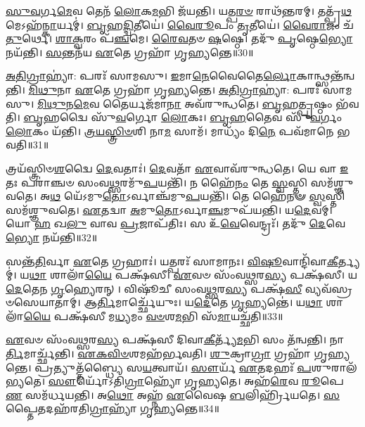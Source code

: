 \-\ul{𑌸𑍁}\-\-\ul{𑌵}\-𑌰𑍍𑌗\-\ul{𑌮𑍇}\-𑌵 𑌤𑍇𑌨᳴ \ul{𑌲𑍋}\-𑌕\-\ul{𑌮}\-𑌭𑌿 𑌜᳴𑌯𑌨𑍍𑌤𑌿।
𑌯𑌤𑍍𑌪\-\ul{𑌰}\-\-\ul{𑍞} 𑌰𑌾𑌥᳴𑌨𑍍𑌤𑌰𑌮𑍍।
𑌤𑌤𑍍𑌪𑍍𑌰᳴\-\ul{𑌥}\-𑌮𑍇\-𑌽𑌹᳴\-\ul{𑌨𑍍𑌕𑌾}\-𑌰𑍍𑌯𑌮𑍍॑।
\-\ul{𑌬𑍃}\-𑌹\-\ul{𑌦𑍍𑌦𑍍𑌵𑌿}\-𑌤𑍀𑌯𑍇॑।
\-\ul{𑌵𑍈}\-\-\ul{𑌰𑍂}\-𑌪𑌂 \ul{𑌤𑍃}\-𑌤𑍀𑌯𑍇॑।
\-\ul{𑌵𑍈}\-\-\ul{𑌰𑌾}\-𑌜𑌂 𑌚᳴\-\ul{𑌤𑍁}\-𑌰𑍍𑌥𑍇।
\-\ul{𑌶𑌾}\-\-\ul{𑌕𑍍𑌵}\-𑌰𑌂 𑌪᳴\-\ul{𑌞𑍍𑌚}\-𑌮𑍇।
\-\ul{𑌰𑍈}\-\-\ul{𑌵}\-𑌤𑍞 \ul{𑌷}\-𑌷𑍍𑌠𑍇।
𑌤𑌦𑍁᳴ \ul{𑌪𑍃}\-𑌷𑍍𑌠𑍇\-\ul{𑌭𑍍𑌯𑍋} 𑌨𑌯᳴𑌨𑍍𑌤𑌿।
\-\ul{𑌸}\-𑌨𑍍𑌤𑌨᳴𑌯 \ul{𑌏}\-𑌤𑍇 𑌗𑍍𑌰𑌹𑌾᳴ 𑌗𑍃𑌹𑍍𑌯𑌨𑍍𑌤𑍇॥30॥

\-\ul{𑌅}\-\-\ul{𑌤𑌿}\-\-\ul{𑌗𑍍𑌰𑌾}\-𑌹𑍍𑌯𑌾॑: 𑌪𑌰𑌃᳴ 𑌸𑌾𑌮𑌸𑍁।
\-\ul{𑌇}\-𑌮𑌾\-\ul{𑌨𑍇}\-𑌵𑍈𑌤𑍈\-\ul{𑌰𑍍𑌲𑍋}\-𑌕𑌾𑌨𑍍𑌥𑍍𑌸𑌨𑍍𑌤᳴𑌨𑍍𑌵𑌨𑍍𑌤𑌿।
\-\ul{𑌮𑌿}\-\-\ul{𑌥𑍁}\-𑌨𑌾 \ul{𑌏}\-𑌤𑍇 𑌗𑍍𑌰𑌹𑌾᳴ 𑌗𑍃𑌹𑍍𑌯𑌨𑍍𑌤𑍇।
\-\ul{𑌅}\-\-\ul{𑌤𑌿}\-\-\ul{𑌗𑍍𑌰𑌾}\-𑌹𑍍𑌯𑌾॑: 𑌪𑌰𑌃᳴ 𑌸𑌾𑌮𑌸𑍁।
\-\ul{𑌮𑌿}\-\-\ul{𑌥𑍁}\-𑌨\-\ul{𑌮𑍇}\-𑌵 𑌤𑍈𑌰𑍍𑌯𑌜᳴𑌮𑌾\-\ul{𑌨𑌾} 𑌅𑌵᳴𑌰𑍁𑌨𑍍𑌧𑌤𑍇।
\-\ul{𑌬𑍃}\-𑌹\-\ul{𑌤𑍍𑌪𑍃}\-𑌷𑍍𑌠𑌂 𑌭᳴𑌵𑌤𑌿।
\-\ul{𑌬𑍃}\-𑌹𑌦𑍍𑌵𑍈 𑌸𑍁᳴\-\ul{𑌵}\-𑌰𑍍𑌗𑍋 \ul{𑌲𑍋}\-𑌕𑌃।
\-\ul{𑌬𑍃}\-\-\ul{𑌹}\-𑌤𑍈𑌵 𑌸𑍁᳴\-\ul{𑌵}\-𑌰𑍍𑌗𑌂 \ul{𑌲𑍋}\-𑌕𑌂 𑌯᳴𑌨𑍍𑌤𑌿।
\-\ul{𑌤𑍍𑌰}\-\-\ul{𑌯}\-\-\ul{𑌸𑍍𑌤𑍍𑌰𑌿}\-\-\ul{𑍞}\-𑌶𑌿  𑌨𑌾\-\ul{𑌮} 𑌸𑌾𑌮᳴।
𑌮𑌾𑌧𑍍𑌯𑌂᳴ 𑌦𑌿\-\ul{𑌨𑍇} 𑌪𑌵᳴𑌮𑌾𑌨𑍇 𑌭𑌵𑌤𑌿॥31॥

𑌤𑍍𑌰𑌯᳴𑌸𑍍𑌤𑍍𑌰𑌿𑍞\-\ul{𑌶}\-𑌦𑍍𑌵𑍈 \ul{𑌦𑍇}\-𑌵𑌤𑌾𑌃॑।
\-\ul{𑌦𑍇}\-𑌵𑌤𑌾᳴ \ul{𑌏}\-𑌵𑌾𑌵᳴𑌰𑍁𑌨𑍍𑌧𑌤𑍇।
𑌯𑍇 𑌵𑌾 \ul{𑌇}\-𑌤𑌃 𑌪𑌰𑌾॑𑌞𑍍𑌚𑍞 𑌸𑌂𑌵\-\ul{𑌥𑍍𑌸}\-𑌰𑌮𑍁᳴\-\ul{𑌪}\-𑌯𑌨𑍍𑌤𑌿᳴।
𑌨 𑌹𑍈᳴\-\ul{𑌨𑌂} 𑌤𑍇 \ul{𑌸𑍍𑌵}\-𑌸𑍍𑌤𑌿 𑌸𑌮᳴𑌶𑍍𑌞𑍁𑌵𑌤𑍇।
𑌅\-\ul{𑌥} 𑌯𑍇᳴\-𑌽𑌮𑍁\-\ul{𑌤𑍋}\-\-𑌽𑌰𑍍𑌵𑌾𑌞𑍍𑌚᳴𑌮𑍁\-\ul{𑌪}\-𑌯𑌨𑍍𑌤𑌿᳴।
𑌤𑍇 𑌹𑍈᳴𑌨𑍟 \ul{𑌸𑍍𑌵}\-𑌸𑍍𑌤𑌿 𑌸𑌮᳴𑌶𑍍𑌞𑍁𑌵𑌤𑍇।
\-\ul{𑌏}\-𑌤𑌦𑍍𑌵𑌾 \ul{𑌅}\-𑌮𑍁\-\ul{𑌤𑍋}\-\-𑌽𑌰𑍍𑌵𑌾\-\ul{𑌞𑍍𑌚}\-𑌮𑍁𑌪᳴𑌯𑌨𑍍𑌤𑌿।
𑌯\-\ul{𑌦𑍇}\-𑌵𑌮𑍍।
𑌯𑍋 \ul{𑌹} 𑌖\-\ul{𑌲𑍁} 𑌵𑌾𑌵 \ul{𑌪𑍍𑌰}\-𑌜𑌾\-𑌪᳴𑌤𑌿𑌃।
𑌸 𑌉᳴\-\ul{𑌵𑍇}\-𑌵𑍇𑌨𑍍𑌦𑍍𑌰𑌃᳴।
𑌤𑌦𑍁᳴ \ul{𑌦𑍇}\-𑌵𑍇\-\ul{𑌭𑍍𑌯𑍋} 𑌨𑌯᳴𑌨𑍍𑌤𑌿॥32॥\anuvakamend[\-\ul{𑌕𑌾}\-𑌰𑍍𑌯𑌾᳴ \ul{𑌵𑌿}\-𑌰𑌾𑌡𑍍𑌗𑍃᳴𑌹𑍍𑌯\-\ul{𑌨𑍍𑌤𑍇} 𑌪𑌵᳴𑌮𑌾𑌨𑍇 𑌭\-\ul{𑌵}\-𑌤𑍀\-\ul{𑌨𑍍𑌦𑍍𑌰} 𑌏𑌕𑌂᳴ 𑌚]

𑌸𑌨𑍍𑌤᳴\-\ul{𑌤𑌿}\-𑌰𑍍𑌵𑌾 \ul{𑌏}\-𑌤𑍇 𑌗𑍍𑌰𑌹𑌾𑌃॑।
𑌯𑌤𑍍𑌪𑌰𑌃᳴ 𑌸𑌾𑌮𑌾𑌨𑌃।
\-\ul{𑌵𑌿}\-\-\ul{𑌷𑍂}\-𑌵𑌾𑌨𑍍𑌦𑌿᳴𑌵𑌾\-\-\ul{𑌕𑍀}\-𑌰𑍍𑌤𑍍𑌯𑌮𑍍॑।
𑌯\-\ul{𑌥𑌾} 𑌶𑌾𑌲𑌾᳴\-\ul{𑌯𑍈} 𑌪𑌕𑍍𑌷᳴𑌸𑍀।
\-\ul{𑌏}\-𑌵𑍞 𑌸𑌂᳴𑌵\-\ul{𑌥𑍍𑌸}\-𑌰\-\ul{𑌸𑍍𑌯} 𑌪𑌕𑍍𑌷᳴𑌸𑍀।
𑌯\-\ul{𑌦𑍇}\-𑌤𑍇𑌨 \ul{𑌗𑍃}\-𑌹𑍍𑌯𑍇𑌰𑌨𑍍।
𑌵𑌿𑌷𑍂᳴𑌚𑍀 𑌸𑌂𑌵\-\ul{𑌥𑍍𑌸}\-𑌰\-\ul{𑌸𑍍𑌯} 𑌪𑌕𑍍𑌷᳴\-\ul{𑌸𑍀} 𑌵𑍍𑌯𑌵᳴𑌸𑍍𑌰𑍞𑌸𑍇𑌯𑌾𑌤𑌾𑌮𑍍।
𑌆\-\ul{𑌰𑍍𑌤𑌿}\-𑌮𑌾𑌰𑍍𑌚𑍍𑌛𑍇᳴𑌯𑍁𑌃।
𑌯\-\ul{𑌦𑍇}\-𑌤𑍇 \ul{𑌗𑍃}\-𑌹𑍍𑌯𑌨𑍍𑌤𑍇॑।
𑌯\-\ul{𑌥𑌾} 𑌶𑌾𑌲𑌾᳴\-\ul{𑌯𑍈} 𑌪𑌕𑍍𑌷᳴𑌸𑍀 𑌮\-\ul{𑌧𑍍𑌯}\-𑌮𑌂 \ul{𑌵}\-\-\ul{𑍞}\-𑌶\-\ul{𑌮}\-𑌭𑌿 𑌸᳴\-\ul{𑌮𑌾}\-𑌯𑌚𑍍𑌛᳴𑌤𑌿॥33॥

\-\ul{𑌏}\-𑌵𑍞 𑌸𑌂᳴𑌵\-\ul{𑌥𑍍𑌸}\-𑌰\-\ul{𑌸𑍍𑌯} 𑌪𑌕𑍍𑌷᳴𑌸𑍀 𑌦𑌿𑌵𑌾\-\ul{𑌕𑍀}\-𑌰𑍍𑌤𑍍𑌯᳴\-\ul{𑌮}\-𑌭𑌿 𑌸𑌂 𑌤᳴𑌨𑍍𑌵𑌨𑍍𑌤𑌿।
𑌨𑌾\-\ul{𑌰𑍍𑌤𑌿}\-𑌮𑌾𑌰𑍍𑌚𑍍𑌛᳴𑌨𑍍𑌤𑌿।
\-\ul{𑌏}\-\-\ul{𑌕}\-\-\ul{𑌵𑌿}\-\-\ul{𑍞}\-𑌶𑌮𑌹᳴𑌰𑍍𑌭𑌵𑌤𑌿।
\-\ul{𑌶𑍁}\-𑌕𑍍𑌰𑌾\-\ul{𑌗𑍍𑌰𑌾} 𑌗𑍍𑌰𑌹𑌾᳴ 𑌗𑍃𑌹𑍍𑌯𑌨𑍍𑌤𑍇।
𑌪𑍍𑌰𑌤𑍍𑌯𑍁𑌤𑍍𑌤᳴𑌬𑍍𑌧𑍍𑌯𑍈 𑌸\-\ul{𑌯}\-𑌤𑍍𑌵𑌾𑌯᳴।
\-\ul{𑌸𑍗}\-𑌰𑍍𑌯᳴ \ul{𑌏}\-𑌤𑌦𑌹𑌃᳴ \ul{𑌪}\-𑌶𑍁𑌰𑌾𑌲᳴𑌭𑍍𑌯𑌤𑍇।
\-\ul{𑌸𑍗}\-𑌰𑍍𑌯𑍋᳴\-𑌽𑌤𑌿\-\ul{𑌗𑍍𑌰𑌾}\-𑌹𑍍𑌯𑍋᳴ 𑌗𑍃𑌹𑍍𑌯𑌤𑍇।
𑌅𑌹᳴\-\ul{𑌰𑍇}\-𑌵 \ul{𑌰𑍂}\-𑌪𑍇\-\ul{𑌣} 𑌸𑌮᳴𑌰𑍍𑌧𑌯𑌨𑍍𑌤𑌿।
𑌅\-\ul{𑌥𑍋} 𑌅𑌹𑍍𑌨᳴ \ul{𑌏}\-𑌵𑍈𑌷 \ul{𑌬}\-𑌲𑌿𑌰𑍍\mbox{}𑌹𑍍𑌰𑌿᳴𑌯𑌤𑍇।
\-\ul{𑌸}\-𑌪𑍍𑌤𑍈𑌤𑌦𑌹᳴𑌰𑌤𑌿\-\ul{𑌗𑍍𑌰𑌾}\-𑌹𑍍𑌯𑌾᳴ 𑌗𑍃𑌹𑍍𑌯𑌨𑍍𑌤𑍇॥34॥

